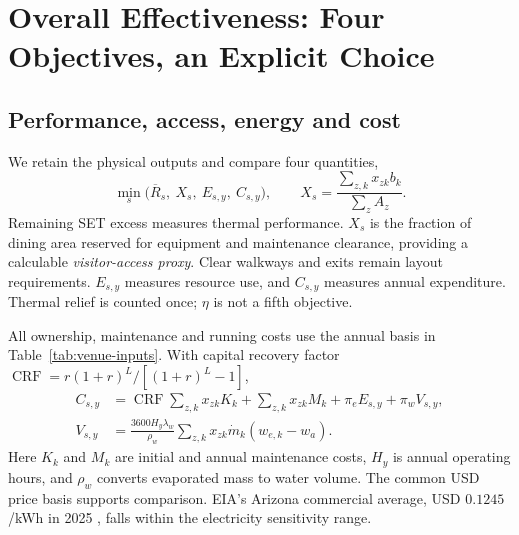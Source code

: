 \section[Cooling effectiveness]{Overall Effectiveness: Four Objectives, an Explicit Choice}
\label{sec:effectiveness}

\subsection{Performance, access, energy and cost}
We retain the physical outputs and compare four quantities,
\begin{equation}
 \min_s\big(\overline R_s,\ X_s,\ E_{s,y},\ C_{s,y}\big),\qquad
 X_s=\frac{\sum_{z,k}x_{zk}b_k}{\sum_z A_z}.
\label{eq:effectiveness-vector}
\end{equation}
Remaining SET excess measures thermal performance. $X_s$ is the fraction of dining area reserved for equipment and maintenance clearance, providing a calculable \textit{visitor-access proxy}. Clear walkways and exits remain layout requirements. $E_{s,y}$ measures resource use, and $C_{s,y}$ measures annual expenditure. Thermal relief is counted once; $\eta$ is not a fifth objective.

All ownership, maintenance and running costs use the annual basis in Table~\ref{tab:venue-inputs}. With capital recovery factor $\operatorname{CRF}=r(1+r)^L/[(1+r)^L-1]$,
\begin{equation}
 \begin{aligned}
 C_{s,y}&=\operatorname{CRF}\sum_{z,k}x_{zk}K_k+
             \sum_{z,k}x_{zk}M_k+\pi_eE_{s,y}+\pi_wV_{s,y},\\
 V_{s,y}&=\frac{3600H_y\lambda_w}{\rho_w}
          \sum_{z,k}x_{zk}\dot m_k(w_{e,k}-w_a).
 \end{aligned}
\label{eq:venue-cost}
\end{equation}
Here $K_k$ and $M_k$ are initial and annual maintenance costs, $H_y$ is annual operating hours, and $\rho_w$ converts evaporated mass to water volume. The common USD price basis supports comparison. EIA's Arizona commercial average, USD $0.1245$/kWh in 2025 \cite{eia-commercial}, falls within the electricity sensitivity range.

